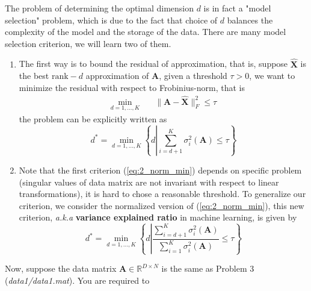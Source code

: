 \documentclass[english,onecolumn]{IEEEtran}
\begin{document}
The problem of determining the optimal dimension $d$ is in fact a "model selection" problem, which is due to the fact that choice of $d$ balances the complexity of the model and the storage of the data. There are many model selection criterion, we will learn two of them.

\begin{enumerate}
    \item The first way is to bound the residual of approximation, that is, suppose $\hat{\mathbf{X}}$ is the best $\mathrm{rank}-d$ approximation of $\mathbf{A}$, given a threshold $\tau>0$, we want to minimize the residual with respect to Frobinius-norm, that is
    \begin{align}
        \min_{d=1,\dots,K}&\quad \|\mathbf{A}-\hat{\mathbf{X}}\|_F^2\leq \tau
    \end{align}
    the problem can be explicitly written as
    \begin{equation}\label{eq:2_norm_min}
        d^*=\min_{d=1,\dots,K}\left\{d\left|\sum_{i=d+1}^K\sigma_{i}^2(\mathbf{A})\leq \tau\right.\right\}
    \end{equation}
    
    \item Note that the first criterion (\ref{eq:2_norm_min}) depends on specific problem (singular values of data matrix are not invariant with respect to linear transformations), it is hard to chose a reasonable threshold. To generalize our criterion, we consider the normalized version of (\ref{eq:2_norm_min}), this new criterion, \textit{a.k.a} \textbf{variance explained ratio} in machine learning, is given by
    \begin{equation}\label{eq:accumulated_error}
        d^*=\min_{d=1,\dots,K}\left\{d\left|\frac{\sum_{i=d+1}^K\sigma_{i}^2(\mathbf{A})}{\sum_{i=1}^K\sigma_i^2(\mathbf{A})}\leq \tau\right.\right\}
    \end{equation}
\end{enumerate}
Now, suppose the data matrix $\mathbf{A}\in\mathbb{R}^{D\times N}$ is the same as {\color{blue} Problem 3} (\emph{data1/data1.mat}). You are required to 
\end{document}
